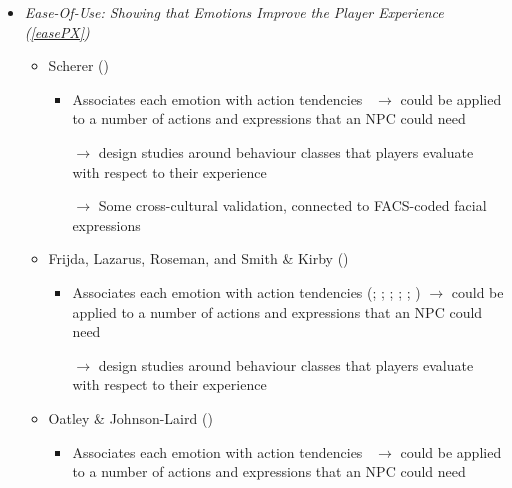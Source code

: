 \begin{itemize}
    \item \textit{Ease-Of-Use: Showing that Emotions Improve the Player
        Experience (\ref{easePX})}
    \begin{itemize}
        \item Scherer (\strong)
        \begin{itemize}
            \item Associates each emotion with action
            tendencies~\citep[p.~108]{scherer2001appraisalB} $\rightarrow$
            could be applied to a number of actions and expressions that an NPC
            could need

            \item [$\rightarrow$] design studies around behaviour classes that
            players evaluate with respect to their experience

            \item [$\rightarrow$] Some cross-cultural validation, connected to
            FACS-coded facial
            expressions~\citep[p.~116--118]{scherer2001appraisalB}
        \end{itemize}

        \item Frijda, Lazarus, Roseman, and Smith \& Kirby (\good)
        \begin{itemize}
            \item Associates each emotion with action tendencies
            (; ; ;
                ;
            ; )
            $\rightarrow$ could be applied to a number of actions and
            expressions that an NPC could need

            \item [$\rightarrow$] design studies around behaviour classes that
            players evaluate with respect to their experience
        \end{itemize}

        \item Oatley \& Johnson-Laird (\good)
        \begin{itemize}
            \item Associates each emotion with action tendencies~\citep[p.~55,
            108, 192, 212]{oatley1992best} $\rightarrow$ could be applied to a
            number of actions and expressions that an NPC could need


\end{itemize}
\end{itemize}
\end{itemize}

